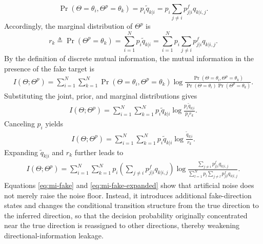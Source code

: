 \documentclass[conference,twocolumn,a4paper]{IEEEtran}
\begin{document}
\begin{equation}
\Pr(\Theta=\theta_i,\Theta^p=\theta_k)=p_i\widetilde q_{k|i}=p_i\sum_{j\neq i} p_{j|i}^{f} q_{k|i,j}.
\end{equation}
Accordingly, the marginal distribution of $\Theta^p$ is
\begin{equation}
r_k\triangleq\Pr(\Theta^p=\theta_k)=\sum_{i=1}^{N}p_i\widetilde q_{k|i}=\sum_{i=1}^{N}p_i\sum_{j\neq i} p_{j|i}^{f} q_{k|i,j}.
\end{equation}
By the definition of discrete mutual information, the mutual information in the presence of the fake target is
\begin{equation}
\begin{aligned}
I(\Theta;\Theta^p)
=\sum_{i=1}^{N}\sum_{k=1}^{N}
\Pr(\Theta=\theta_i,\Theta^p=\theta_k)
\log
\frac{\Pr(\Theta=\theta_i,\Theta^p=\theta_k)}{\Pr(\Theta=\theta_i)\Pr(\Theta^p=\theta_k)}.
\end{aligned}
\end{equation}
Substituting the joint, prior, and marginal distributions gives
\begin{equation}
\begin{aligned}
I(\Theta;\Theta^p)
=\sum_{i=1}^{N}\sum_{k=1}^{N}
p_i\widetilde q_{k|i}
\log\frac{p_i\widetilde q_{k|i}}{p_i r_k}.
\end{aligned}
\label{eq:mi-fake}
\end{equation}
Canceling $p_i$ yields
\begin{equation}
\begin{aligned}
I(\Theta;\Theta^p)
=\sum_{i=1}^{N}\sum_{k=1}^{N}
p_i\widetilde q_{k|i}
\log\frac{\widetilde q_{k|i}}{r_k}.
\end{aligned}
\end{equation}
Expanding $\widetilde q_{k|i}$ and $r_k$ further leads to
\begin{equation}
\begin{aligned}
I(\Theta;\Theta^p)
=\sum_{i=1}^{N}\sum_{k=1}^{N}
p_i\left(\sum_{j\neq i} p_{j|i}^{f} q_{k|i,j}\right)
\log\frac{\sum_{j\neq i} p_{j|i}^{f} q_{k|i,j}}{\sum_{l=1}^{N}p_l\sum_{j\neq l} p_{j|l}^{f} q_{k|l,j}}.
\end{aligned}
\label{eq:mi-fake-expanded}
\end{equation}
Equations \eqref{eq:mi-fake} and \eqref{eq:mi-fake-expanded} show that artificial noise does not merely raise the noise floor. Instead, it introduces additional fake-direction states and changes the conditional transition structure from the true direction to the inferred direction, so that the decision probability originally concentrated near the true direction is reassigned to other directions, thereby weakening directional-information leakage.
\end{document}
